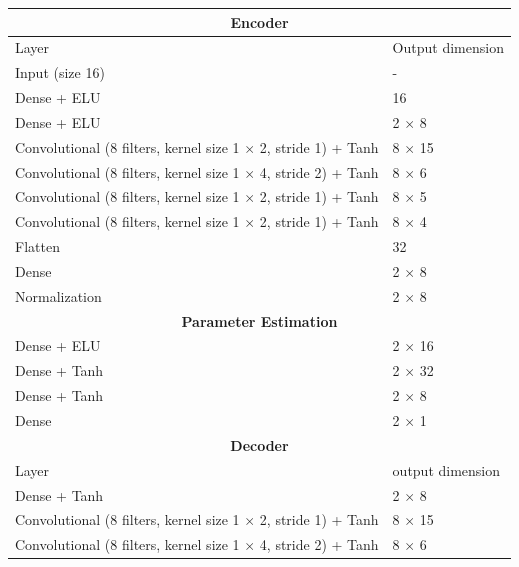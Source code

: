 \begin{table}[tp!]
	\begin{adjustbox}{width=0.85\columnwidth,center}
		\begin{tabular}{|l|l|} 
			\hline
			\multicolumn{2}{|c|}{\textbf{Encoder}} 															\\
			\hline
			Layer 																	&	Output dimension	\\
			\hline
			Input (size 16)      												&	-    	 		    \\ 
			Dense + ELU          													&	16					\\
			Dense + ELU   															&	2 $\times$ 8		\\
			Convolutional (8 filters, kernel size 1 $\times$ 2, stride 1) + Tanh 	&   8 $\times$ 15		\\
			Convolutional (8 filters, kernel size 1 $\times$ 4, stride 2) + Tanh 	&   8 $\times$ 6		\\
			Convolutional (8 filters, kernel size 1 $\times$ 2, stride 1) + Tanh 	&   8 $\times$ 5		\\
			Convolutional (8 filters, kernel size 1 $\times$ 2, stride 1) + Tanh 	&   8 $\times$ 4		\\
			Flatten															 		&   32					\\
			Dense																	&	2 $\times$ 8		\\
			Normalization															&	2 $\times$ 8		\\
			\hline   
			\hline												
			\multicolumn{2}{|c|}{\textbf{Parameter Estimation}} 											\\
			\hline
			Dense + ELU																&	2 $\times$ 16		\\
			Dense + Tanh															&	2 $\times$ 32		\\
			Dense + Tanh															&	2 $\times$ 8		\\
			Dense																	&	2 $\times$	1		\\
			\hline
			\hline
			\multicolumn{2}{|c|}{\textbf{Decoder}}															\\
			\hline
			Layer 																	&	output dimension	\\
			\hline
			Dense + Tanh          													&	2 $\times$ 8		\\
			Convolutional (8 filters, kernel size 1 $\times$ 2, stride 1) + Tanh 	&   8 $\times$ 15		\\
			Convolutional (8 filters, kernel size 1 $\times$ 4, stride 2) + Tanh 	&   8 $\times$ 6		\\

\end{tabular}
\end{adjustbox}
\end{table}
